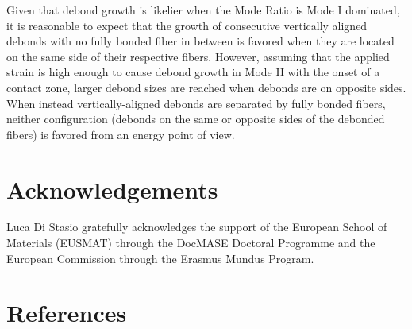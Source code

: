 Given that debond growth is likelier when the Mode Ratio is Mode I dominated, it is reasonable to expect that the growth of consecutive vertically aligned debonds with no fully bonded fiber in between is favored when they are located on the same side of their respective fibers. However, assuming that the applied strain is high enough to cause debond growth in Mode II with the onset of a contact zone, larger debond sizes are reached when debonds are on opposite sides. When instead vertically-aligned debonds are separated by fully bonded fibers, neither configuration (debonds on the same or opposite sides of the debonded fibers) is favored from an energy point of view.


\section*{Acknowledgements}

Luca Di Stasio gratefully acknowledges the support of the European School of Materials (EUSMAT) through the DocMASE Doctoral Programme and the European Commission through the Erasmus Mundus Program.


\section*{References}
\printbibliography[heading=none]
